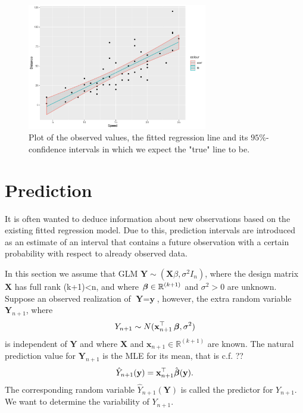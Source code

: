 \begin{example} 
\begin{figure}[H]
    \centering
    \includegraphics[width = 0.7\textwidth]{figures/Nanna/Konfidensinterval.pdf}
    \caption{Plot of the observed values, the fitted regression line and its $95\%$-confidence intervals in which we expect the "true" line to be.}
    \label{fig:t_distributionplot2}
\end{figure}

\end{example}

\section{Prediction}

It is often wanted to deduce information about new observations based on the existing fitted regression model. 
Due to this, prediction intervals are introduced as an estimate of an interval that contains a future observation with a certain probability with respect to already observed data.

In this section we assume that GLM $\textbf{Y}\sim (\textbf{X}\beta, \sigma^2 I_n)$, where the design matrix $\textbf{X}$ has full rank (k+1)<n, and where $\operatorname{\boldsymbol{\beta}} \in \mathbb{R}^{(k+1)}$ and $\sigma^2>0$ are unknown. Suppose an observed realization of $\textbf{Y}=\textbf{y}$, however, the extra random variable $\textbf{Y}_{n+1}$, where
\begin{align*}
    Y_{n+1}\sim N(\textbf{x}^\top_{n+1}\operatorname{\boldsymbol{\beta}},\sigma^2)
\end{align*}
is independent of $\textbf{Y}$ and where $\textbf{X}$ and $\textbf{x}_{n+1}\in\mathbb{R}^{(k+1)}$ are known. 
The natural prediction value for $\textbf{Y}_{n+1}$ is the MLE for its mean, that is c.f. ??
\begin{align*}
    \hat{Y}_{n+1}(\textbf{y})=\textbf{x}^\top_{n+1}\hat{\operatorname{\boldsymbol{\beta}}}(\textbf{y}).
\end{align*}
The corresponding random variable $\hat{Y}_{n+1}(\textbf{Y})$ is called the predictor for $Y_{n+1}$. 
We want to determine the variability of $Y_{n+1}$.

